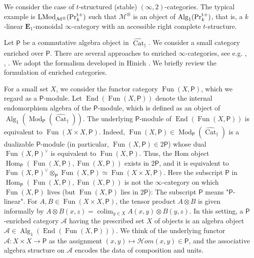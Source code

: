 \documentclass[leqno,12pt]{amsart}
\theoremstyle{plain}
\theoremstyle{definition}
\newcommand{\PRTT}{\textup{Pr}^{\textup{t}+}}
\newcommand{\MMM}{\mathcal{M}}
\newcommand{\Hom}{\operatorname{Hom}}
\newcommand{\Mod}{\operatorname{Mod}}
\newcommand{\colim}{\operatorname{colim}}
\newcommand{\Fun}{\operatorname{Fun}}
\newcommand{\Alg}{\operatorname{Alg}}
\newcommand{\End}{\operatorname{End}}
\newcommand{\vCat}{\widehat{\operatorname{Cat}}_\dagger}
\newcommand{\eone}{\mathbf{E}_1}
\newcommand{\LMod}{\operatorname{LMod}}
\begin{document}
\subsection{}

\label{enrichsec}


We consider the case of $t$-structured (stable) $(\infty,2)$-categories.
The typical example is $\LMod_{\MMM^\otimes}(\PRTT_k)$ such that $\MMM^\otimes$ is an object of $\Alg_1(\PRTT_k)$, that is,
a $k$-linear $\eone$-monoidal $\infty$-category
with an accessible right complete $t$-structure.

Let $\mathsf{P}$ be a commutative algebra object in $\vCat$.
We consider a small category enriched over $\mathsf{P}$.
There are several approaches to enriched $\infty$-categories, see e.g. \cite{GH}, \cite{Hinen}, \cite{RZ}. We adopt the formalism developed in Hinich \cite{Hinen}.
We briefly review the formulation of enriched categories.

For a small set $X$, we consider the functor category $\Fun(X,\mathsf{P})$, which we regard as a $\mathsf{P}$-module.
Let $\End(\Fun(X,\mathsf{P}))$
denote the internal endomorphism algebra of the $\mathsf{P}$-module, which is defined as an object of $\Alg_1(\Mod_{\mathsf{P}}(\vCat))$.
The underlying $\mathsf{P}$-module of $\End(\Fun(X,\mathsf{P}))$ is equivalent to
$\Fun(X\times X,\mathsf{P})$.
Indeed, $\Fun(X,\mathsf{P})\in \Mod_{\mathsf{P}}(\vCat)$ is a dualizable $\mathsf{P}$-module (in particular, $\Fun(X,\mathsf{P})\in 2\mathsf{P}$)
whose dual $\Fun(X,\mathsf{P})^\vee$ is equivalent to $\Fun(X,\mathsf{P})$. Thus, the Hom object
$\Hom_{\mathsf{P}}(\Fun(X,\mathsf{P}),\Fun(X,\mathsf{P}))$ exists in $2\mathsf{P}$,
and it is equivalent to $\Fun(X,\mathsf{P})^\vee\otimes_{\mathsf{P}}\Fun(X,\mathsf{P})\simeq \Fun(X\times X, \mathsf{P})$.
Here the subscript $\mathsf{P}$ in $\Hom_{\mathsf{P}}(\Fun(X,\mathsf{P}),\Fun(X,\mathsf{P}))$ is not the $\infty$-category
on which $\Fun(X,\mathsf{P})$ lives (but $\Fun(X,\mathsf{P})$ lies in $2\mathsf{P}$): The subscript $\mathsf{P}$ means "$\mathsf{P}$-linear".
For $A,B \in\Fun(X\times X, \mathsf{P})$, the tensor product $A\otimes B$ is given informally by
$A\otimes B(x,z)=\colim_{y\in X} A(x,y)\otimes B(y,z)$.
In this setting, a $\mathsf{P}$-enriched category $\mathcal{A}$ having the prescribed set $X$ of objects is an algebra object $\mathcal{A}\in \Alg_1(\End(\Fun(X,\mathsf{P})))$. 
We think of the underlying functor $\mathcal{A}:X\times X\to \mathsf{P}$ as the assignment 
$(x,y)\mapsto \mathcal{H}om(x,y)\in \mathsf{P}$, and the associative algebra structure on $\mathcal{A}$ encodes the data of composition and units.
\end{document}
